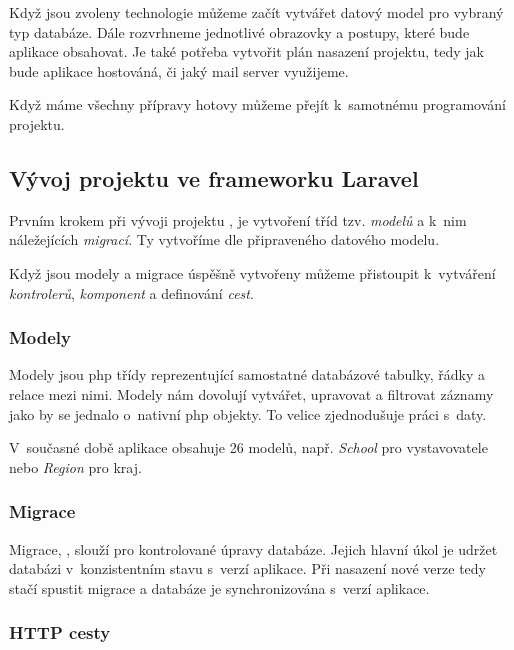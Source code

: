 Když jsou zvoleny technologie můžeme začít vytvářet datový model pro vybraný typ databáze. Dále rozvrhneme jednotlivé obrazovky a postupy, které bude aplikace obsahovat. Je také potřeba vytvořit plán nasazení projektu, tedy jak bude aplikace hostováná, či jaký mail server využijeme.

Když máme všechny přípravy hotovy můžeme přejít k~samotnému programování projektu.

\subsection{Vývoj projektu ve frameworku Laravel}
\label{sub:laravel-development}

Prvním krokem při vývoji projektu \inlaravel, je vytvoření tříd tzv. \emph{modelů}\cite{laravel-models} a k~nim náležejících \emph{migrací}\cite{laravel-migrations}. Ty vytvoříme dle připraveného datového modelu.

Když jsou modely a migrace úspěšně vytvořeny můžeme přistoupit k~vytváření \emph{kontrolerů}\cite{laravel-controller}, \emph{komponent}\cite{laravel-blade-component} a definování \emph{cest}\cite{laravel-routes}.

\subsubsection{Modely}

Modely jsou \acrshort{php} třídy reprezentující samostatné databázové tabulky, řádky a relace mezi nimi. Modely nám dovolují vytvářet, upravovat a filtrovat záznamy jako by se jednalo o~nativní \acrshort{php} objekty. To velice zjednodušuje práci s~daty.

V~současné době aplikace \bso{} obsahuje 26 modelů, např. \emph{School} pro vystavovatele nebo \emph{Region} pro kraj. 

\subsubsection{Migrace}

Migrace, \inlaravel, slouží pro kontrolované úpravy databáze. Jejich hlavní úkol je udržet databázi v~konzistentním stavu s~verzí aplikace. Při nasazení nové verze tedy stačí spustit migrace a databáze je synchronizována s~verzí aplikace.

\subsubsection{HTTP cesty}

